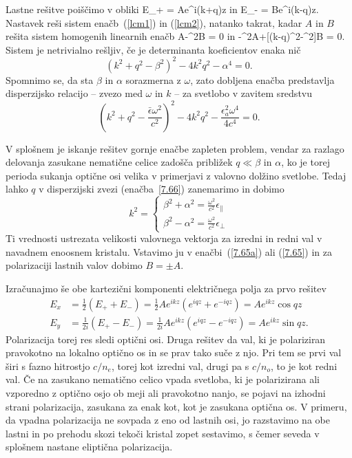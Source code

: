 Lastne rešitve poiščimo v obliki 
\beq
E_{+}  =  Ae^{i(k+q)z} 
\label{7.65a}
\eeq
in
\beq
E_{-}  =  Be^{i(k-q)z}.
\label{7.65}
\eeq
Nastavek reši sistem enačb~(\ref{lcm1}) in (\ref{lcm2}), 
natanko takrat, kadar $A$ in $B$ rešita sistem homogenih linearnih enačb 
\beq
[(k+q)^{2}-\beta^{2}]A-\alpha^{2}B  =  0 
\eeq
in
\beq
-\alpha^{2}A+[(k-q)^{2}-\beta^{2}]B  =  0.
\eeq
 Sistem je netrivialno rešljiv, če je determinanta koeficientov enaka
nič
\begin{equation}
(k^{2}+q^{2}-\beta^{2})^{2}-4k^{2}q^{2}-\alpha^{4}=0.
\label{7.66}
\end{equation}
Spomnimo se, da sta $\beta$ in $\alpha$ sorazmerna z $\omega$,
zato dobljena enačba predstavlja disperzijsko relacijo -- zvezo med 
$\omega$ in $k$ -- za svetlobo v zavitem sredstvu
\begin{equation}
(k^{2}+q^{2}-\frac{\bar{\epsilon}\omega^{2}}{c^{2}})^{2}-
4k^{2}q^{2}- \frac{\epsilon_{a}^2\omega^{4}}{4c^{4}}
=0.
\label{7.66a}
\end{equation}

V splošnem je iskanje rešitev gornje enačbe zapleten problem, vendar 
za razlago delovanja zasukane nematične celice zadošča približek 
$q\ll\beta$ in $\alpha$, ko je torej perioda sukanja optične osi
velika v primerjavi z valovno dolžino svetlobe. Tedaj lahko $q$ v disperzijski
zvezi (enačba~\ref{7.66}) zanemarimo in dobimo
\begin{equation}
k^{2}=\left\{ \begin{matrix}\beta^{2}+\alpha^{2}=\frac{\omega^{2}}{c^{2}}\epsilon_{\parallel} 
\\               \beta^{2}-\alpha^{2}=\frac{\omega^{2}}{c^{2}}\epsilon_{\bot} 
              \end{matrix}\right.
\label{7.67}
\end{equation}
 Ti vrednosti ustrezata velikosti valovnega vektorja za izredni
in redni val v navadnem enoosnem kristalu. Vstavimo ju v enačbi~(\ref{7.65a}) ali
(\ref{7.65}) in za polarizaciji lastnih valov dobimo $B=\pm A$.

Izračunajmo še obe kartezični komponenti električnega polja za prvo rešitev
\begin{align}
E_{x} &=  \frac{1}{2}(E_{+}+E_{-})  =  \frac{1}{2}Ae^{ikz}(e^{iqz}+e^{-iqz})  =  Ae^{ikz}\cos qz\\
E_{y} & = \frac{1}{2i}(E_{+}-E_{-})  =  \frac{1}{2i}Ae^{ikz}(e^{iqz}-e^{-iqz})  =  Ae^{ikz}\sin qz.
\label{7.68}
\end{align}
Polarizacija torej res sledi optični osi. Druga rešitev da val,
ki je polariziran pravokotno na lokalno optično os in se prav tako
suče z njo. Pri tem se prvi val širi s fazno hitrostjo $c/n_{e}$, torej kot
izredni val, drugi pa s $c/n_{o}$, to je kot redni val. Če na zasukano
nematično celico vpada svetloba, ki je polarizirana ali vzporedno z 
optično osjo ob meji ali pravokotno nanjo, se pojavi na izhodni strani 
polarizacija, zasukana za enak kot, kot je zasukana optična os. 
V primeru, da vpadna polarizacija ne sovpada z eno od
lastnih osi, jo razstavimo na obe lastni in po prehodu skozi
tekoči kristal zopet sestavimo, s čemer seveda v splošnem nastane eliptična
polarizacija.

